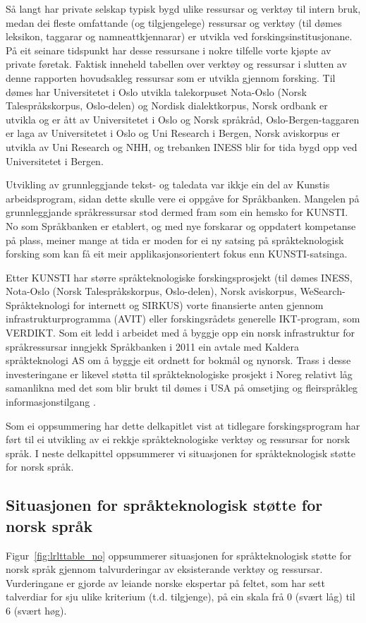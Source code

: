 \begin{multicols}{2}
Så langt har private selskap typisk bygd ulike ressursar og verktøy til intern bruk, medan dei fleste omfattande (og tilgjengelege) ressursar og verktøy (til dømes leksikon, taggarar og namneattkjennarar) er utvikla ved forskingsinstitusjonane. På eit seinare tidspunkt har desse ressursane i nokre tilfelle vorte kjøpte av private føretak. Faktisk inneheld tabellen over verktøy og ressursar i slutten av denne rapporten hovudsakleg ressursar som er utvikla gjennom forsking. Til dømes har Universitetet i Oslo utvikla talekorpuset Nota-Oslo (Norsk Talespråkskorpus, Oslo-delen) og Nordisk dialektkorpus, Norsk ordbank er utvikla og er ått av Universitetet i Oslo og Norsk språkråd, Oslo-Bergen-taggaren er laga av Universitetet i Oslo og Uni Research i Bergen, Norsk aviskorpus er utvikla av Uni Research og NHH, og trebanken INESS blir for tida bygd opp ved Universitetet i Bergen.

Utvikling av grunnleggjande tekst- og taledata var ikkje ein del av Kunstis arbeidsprogram, sidan dette skulle vere ei oppgåve for Språkbanken. Mangelen på grunnleggjande språkressursar stod dermed fram som ein hemsko for KUNSTI. No som Språkbanken er etablert, og med nye forskarar og oppdatert kompetanse på plass, meiner mange at tida er moden for ei ny satsing på språkteknologisk forsking som kan få eit meir applikasjonsorientert fokus enn KUNSTI-satsinga.

Etter KUNSTI har større språkteknologiske forskingsprosjekt (til dømes INESS, Nota-Oslo (Norsk Talespråkskorpus, Oslo-delen), Norsk aviskorpus, WeSearch-Språkteknologi for internett og SIRKUS) vorte finansierte anten gjennom infrastrukturprogramma (AVIT) eller forskingsrådets generelle IKT-program, som VERDIKT. 
Som eit ledd i arbeidet med å byggje opp ein norsk infrastruktur for språkressursar inngjekk Språkbanken i 2011 ein avtale med Kaldera språkteknologi AS om å byggje eit ordnett for bokmål og nynorsk. Trass i desse investeringane er likevel støtta til språkteknologiske prosjekt i Noreg relativt låg samanlikna med det som blir brukt til dømes i USA på omsetjing og fleirspråkleg informasjonstilgang \cite{laz1}.

Som ei oppsummering har dette delkapitlet vist at tidlegare forskingsprogram har ført til ei utvikling av ei rekkje språkteknologiske verktøy og ressursar for norsk språk. 
I neste delkapittel oppsummerer vi situasjonen for språkteknologisk støtte for norsk språk. 

\subsection{Situasjonen for språkteknologisk støtte for norsk språk}
Figur~\ref{fig:lrlttable_no} oppsummerer situasjonen for språkteknologisk støtte for norsk språk gjennom talvurderingar av eksisterande verktøy og ressursar. Vurderingane er gjorde av leiande norske ekspertar på feltet, som har sett talverdiar for sju ulike kriterium (t.d. tilgjenge), på ein skala frå 0 (svært låg) til 6 (svært høg).


\end{multicols}

